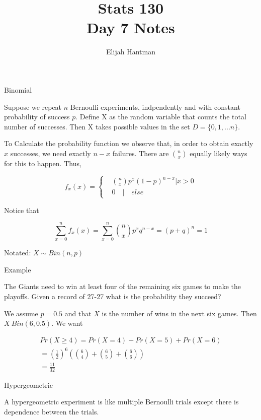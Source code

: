 \documentclass{report}
\title{\Huge{Stats 130}\\Day 7 Notes}
\author{\huge{Elijah Hantman}}
\date{}
\begin{document}
\maketitle
\newpage

\begin{description}
    \item {\large Binomial}
        \begin{mdframed}
            Suppose we repeat $n$ Bernoulli experiments, indpendently
            and with constant probability of success  $p$. Define X
            as the random variable that counts the total number of
            successes. Then X takes possible values in the set
            $D = \{0, 1, ... n\}$. 

            To Calculate the probability function we observe
            that, in order to obtain exactly $x$ successes,
            we need exactly $n - x$ failures. There are
            $\binom{n}{x}$ equally likely ways for this to
            happen. Thus,

            \begin{displaymath}
                f_x(x) = 
                \begin{cases}
                &\binom{n}{x}p^x(1-p)^{n-x} | x > 0\\ 
                & 0\quad | \quad else
                \end{cases}
            \end{displaymath}
            
            Notice that

            \begin{displaymath}
                \sum_{x=0}^n f_x(x) = \sum_{x=0}^n \binom{n}{x} p^x q^{n-x} = (p+q)^n = 1
            \end{displaymath}

            Notated: $X \sim Bin(n, p)$
        \end{mdframed}
    \item {\large Example}
        \begin{mdframed}
            The Giants need to win at least four of the remaining
            six games to make the playoffs. Given a record of 
            27-27 what is the probability they succeed?

            We assume $p = 0.5$ and that $X$ is the number of wins
            in the next six games. Then $X ~ Bin(6,0.5)$. We want

             \begin{gather}
                Pr(X \ge 4) = Pr(X = 4) + Pr(X = 5) + Pr(X = 6)\\
                = (\frac{1}{2})^6 (\binom{6}{4} + \binom{6}{5} + \binom{6}{6})\\
                = \frac{11}{32}
            \end{gather}
        \end{mdframed}
        \pagebreak
    \item {\large Hypergeometric}
        \begin{mdframed}
            A hypergeometric experiment is like multiple
            Bernoulli trials except there is dependence
            between the trials.


\end{mdframed}
\end{description}
\end{document}
